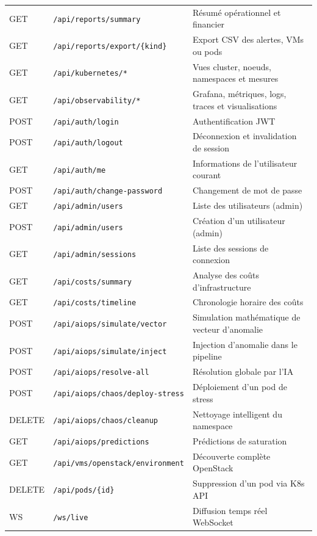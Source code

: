 \documentclass[11pt,a4paper]{report}
\begin{document}
\begin{table}[H]
\begin{tabular}{|l|l|p{6cm}|}
GET  & \texttt{/api/reports/summary}         & Résumé opérationnel et financier \\
GET  & \texttt{/api/reports/export/\{kind\}} & Export CSV des alertes, VMs ou pods \\
GET  & \texttt{/api/kubernetes/*}            & Vues cluster, noeuds, namespaces et mesures \\
GET  & \texttt{/api/observability/*}         & Grafana, métriques, logs, traces et visualisations \\
POST & \texttt{/api/auth/login}             & Authentification JWT \\
POST & \texttt{/api/auth/logout}            & Déconnexion et invalidation de session \\
GET  & \texttt{/api/auth/me}               & Informations de l'utilisateur courant \\
POST & \texttt{/api/auth/change-password}   & Changement de mot de passe \\
GET  & \texttt{/api/admin/users}            & Liste des utilisateurs (admin) \\
POST & \texttt{/api/admin/users}            & Création d'un utilisateur (admin) \\
GET  & \texttt{/api/admin/sessions}         & Liste des sessions de connexion \\
GET  & \texttt{/api/costs/summary}          & Analyse des coûts d'infrastructure \\
GET  & \texttt{/api/costs/timeline}         & Chronologie horaire des coûts \\
POST & \texttt{/api/aiops/simulate/vector}  & Simulation mathématique de vecteur d'anomalie \\
POST & \texttt{/api/aiops/simulate/inject}  & Injection d'anomalie dans le pipeline \\
POST & \texttt{/api/aiops/resolve-all}      & Résolution globale par l'IA \\
POST & \texttt{/api/aiops/chaos/deploy-stress} & Déploiement d'un pod de stress \\
DELETE & \texttt{/api/aiops/chaos/cleanup}  & Nettoyage intelligent du namespace \\
GET  & \texttt{/api/aiops/predictions}      & Prédictions de saturation \\
GET  & \texttt{/api/vms/openstack/environment} & Découverte complète OpenStack \\
DELETE & \texttt{/api/pods/\{id\}}           & Suppression d'un pod via K8s API \\
WS   & \texttt{/ws/live}                    & Diffusion temps réel WebSocket \\
\hline
\end{tabular}
\end{table}
\end{document}
